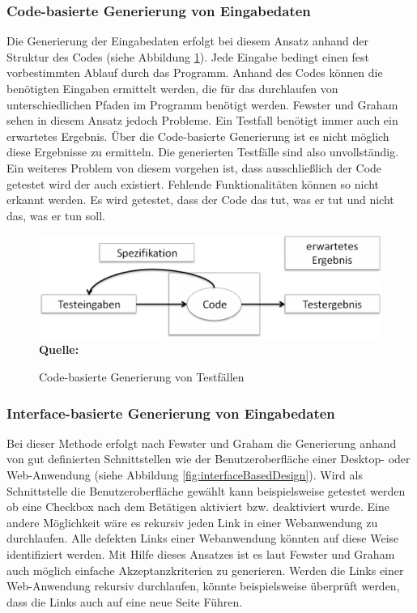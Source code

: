\subsubsection{Code-basierte Generierung von Eingabedaten}
\label{subsubsec:codebasierte_generierung}
Die Generierung der Eingabedaten erfolgt bei diesem Ansatz anhand der Struktur des Codes (siehe Abbildung \ref{fig:codeBasedDesign}). Jede Eingabe bedingt einen fest vorbestimmten Ablauf durch das Programm. Anhand des Codes können die benötigten Eingaben ermittelt werden, die für das durchlaufen von unterschiedlichen Pfaden im Programm benötigt werden.
Fewster und Graham \cite[vgl. S. 19 ff.]{fewster_software_1999} sehen in diesem Ansatz jedoch Probleme. Ein Testfall benötigt immer auch ein erwartetes Ergebnis. Über die Code-basierte Generierung ist es nicht möglich diese Ergebnisse zu ermitteln. Die generierten Testfälle sind also unvollständig. Ein weiteres Problem von diesem vorgehen ist, dass ausschließlich der Code getestet wird der auch existiert. Fehlende Funktionalitäten können so nicht erkannt werden. Es wird getestet, dass der Code das \grq tut, was er tut und nicht das, was er tun soll.\grq\ \cite[vgl. S. 20]{fewster_software_1999}
\begin{figure}[htb]
  \centering  
  \includegraphics[scale=0.6]{img/codeBasedDesign.png}\\
  \footnotesize\sffamily\textbf{Quelle:} \cite[vgl. S. 19]{fewster_software_1999}
  \caption{Code-basierte Generierung von Testfällen}
  \label{fig:codeBasedDesign}
\end{figure}


\subsubsection{Interface-basierte Generierung von Eingabedaten}
\label{subsubsec:interfacebasierte_generierung}
Bei dieser Methode erfolgt nach Fewster und Graham \cite[vgl. S. 20]{fewster_software_1999} die Generierung anhand von gut definierten Schnittstellen wie der Benutzeroberfläche einer Desktop- oder Web-Anwendung (siehe Abbildung \ref{fig:interfaceBasedDesign}). 
Wird als Schnittstelle die Benutzeroberfläche gewählt kann beispielsweise getestet werden ob eine Checkbox nach dem Betätigen aktiviert bzw. deaktiviert wurde. Eine andere Möglichkeit wäre es rekursiv jeden Link in einer Webanwendung zu durchlaufen. Alle defekten Links einer Webanwendung könnten auf diese Weise identifiziert werden.
Mit Hilfe dieses Ansatzes ist es laut Fewster und Graham \cite[vgl. S. 21]{fewster_software_1999} auch möglich einfache Akzeptanzkriterien zu generieren. Werden die Links einer Web-Anwendung rekursiv durchlaufen, könnte beispielsweise überprüft werden, dass die Links auch auf eine neue Seite Führen. 

